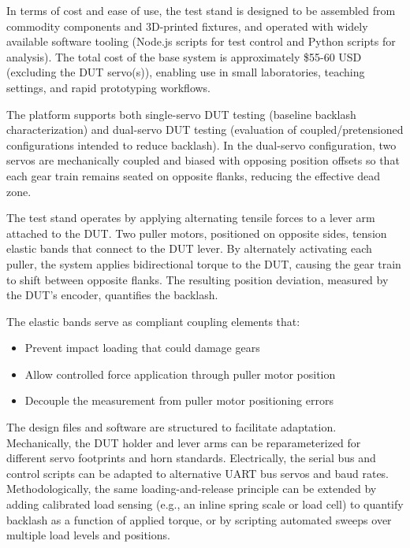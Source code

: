 \documentclass[11pt,letterpaper]{article}
\begin{document}
In terms of cost and ease of use, the test stand is designed to be assembled from commodity components and 3D-printed fixtures, and operated with widely available software tooling (Node.js scripts for test control and Python scripts for analysis). The total cost of the base system is approximately \$55-60 USD (excluding the DUT servo(s)), enabling use in small laboratories, teaching settings, and rapid prototyping workflows.

The platform supports both single-servo DUT testing (baseline backlash characterization) and dual-servo DUT testing (evaluation of coupled/pretensioned configurations intended to reduce backlash). In the dual-servo configuration, two servos are mechanically coupled and biased with opposing position offsets so that each gear train remains seated on opposite flanks, reducing the effective dead zone.

The test stand operates by applying alternating tensile forces to a lever arm attached to the DUT. Two puller motors, positioned on opposite sides, tension elastic bands that connect to the DUT lever. By alternately activating each puller, the system applies bidirectional torque to the DUT, causing the gear train to shift between opposite flanks. The resulting position deviation, measured by the DUT's encoder, quantifies the backlash.

The elastic bands serve as compliant coupling elements that:
\begin{itemize}
    \item Prevent impact loading that could damage gears
    \item Allow controlled force application through puller motor position
    \item Decouple the measurement from puller motor positioning errors
\end{itemize}

The design files and software are structured to facilitate adaptation. Mechanically, the DUT holder and lever arms can be reparameterized for different servo footprints and horn standards. Electrically, the serial bus and control scripts can be adapted to alternative UART bus servos and baud rates. Methodologically, the same loading-and-release principle can be extended by adding calibrated load sensing (e.g., an inline spring scale or load cell) to quantify backlash as a function of applied torque, or by scripting automated sweeps over multiple load levels and positions.

\newpage
\end{document}
